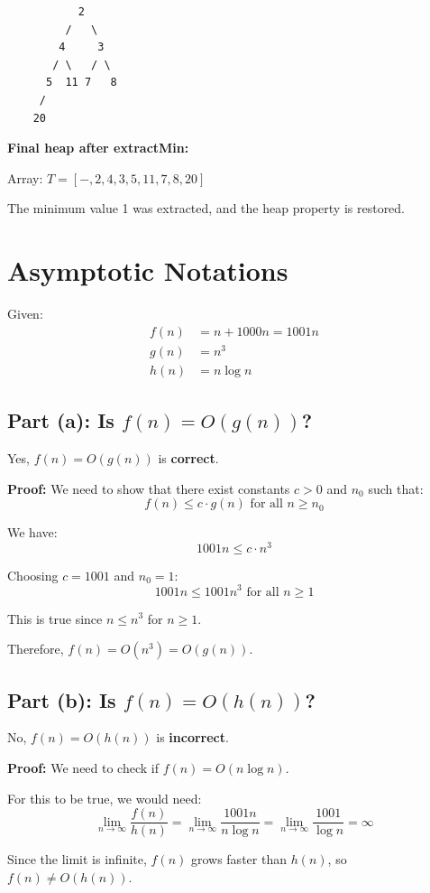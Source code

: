 \documentclass[12pt,a4paper]{article}
\begin{document}
\begin{verbatim}
           2
         /   \
        4     3
       / \   / \
      5  11 7   8
     / 
    20
\end{verbatim}

\textbf{Final heap after extractMin:}

Array: $T = [-, 2, 4, 3, 5, 11, 7, 8, 20]$

The minimum value 1 was extracted, and the heap property is restored.

\section{Asymptotic Notations}

Given:
\begin{align*}
f(n) &= n + 1000n = 1001n \\
g(n) &= n^3 \\
h(n) &= n\log n
\end{align*}

\subsection{Part (a): Is $f(n) = O(g(n))$?}

Yes, $f(n) = O(g(n))$ is \textbf{correct}.

\textbf{Proof:} We need to show that there exist constants $c > 0$ and $n_0$ such that:
\[f(n) \leq c \cdot g(n) \text{ for all } n \geq n_0\]

We have:
\[1001n \leq c \cdot n^3\]

Choosing $c = 1001$ and $n_0 = 1$:
\[1001n \leq 1001n^3 \text{ for all } n \geq 1\]

This is true since $n \leq n^3$ for $n \geq 1$.

Therefore, $f(n) = O(n^3) = O(g(n))$. \checkmark

\subsection{Part (b): Is $f(n) = O(h(n))$?}

No, $f(n) = O(h(n))$ is \textbf{incorrect}.

\textbf{Proof:} We need to check if $f(n) = O(n\log n)$.

For this to be true, we would need:
\[\lim_{n \to \infty} \frac{f(n)}{h(n)} = \lim_{n \to \infty} \frac{1001n}{n\log n} = \lim_{n \to \infty} \frac{1001}{\log n} = \infty\]

Since the limit is infinite, $f(n)$ grows faster than $h(n)$, so $f(n) \neq O(h(n))$.
\end{document}
